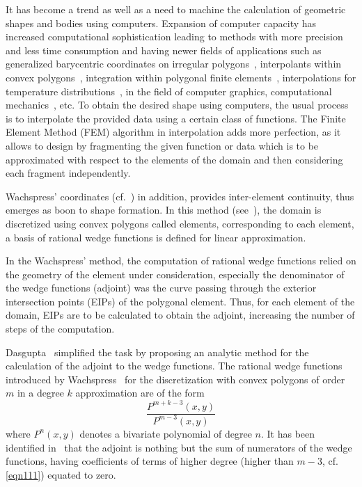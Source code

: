 \documentclass[automatic-bibliography]{univsciauth}
\begin{document}
It has become a trend as well as a need to machine the calculation of geometric
shapes and bodies using computers. Expansion of computer capacity has increased
computational sophistication leading to methods with more precision and less
time consumption and having newer fields of applications such as generalized
barycentric coordinates on irregular polygons~\cite{7}, interpolants within
convex polygons~\cite{das}, integration within polygonal finite
elements~\cite{9}, interpolations for temperature distributions~\cite{10}, in
the field of computer graphics, computational mechanics~\cite{11}, etc. To
obtain the desired shape using computers, the usual process is to interpolate
the provided data using a certain class of functions. The Finite Element Method
(FEM) algorithm in interpolation adds more perfection, as it allows to design by
fragmenting the given function or data which is to be approximated with respect
to the elements of the domain and then considering each fragment independently.

Wachspress' coordinates (cf.~\cite{wach}) in addition, provides inter-element
continuity, thus emerges as boon to shape formation. In this method
(see~\cite{wachs}), the domain is discretized using convex polygons called
elements, corresponding to each element, a basis of rational wedge functions is
defined for linear approximation.

In the Wachspress\rq{} method, the computation of rational wedge functions
relied on the geometry of the element under consideration, especially the
denominator of the wedge functions (adjoint) was the curve passing through the
exterior intersection points (EIPs) of the polygonal element. Thus, for each
element of the domain, EIPs are to be calculated to obtain the adjoint,
increasing the number of steps of the computation.

Dasgupta~\cite{das} simplified the task by proposing an analytic method for the
calculation of the adjoint to the wedge functions. The rational wedge functions
introduced by Wachspress~\cite{wachs} for the discretization with convex
polygons of order $m$ in a degree $k$ approximation are of the form
\begin{equation}
  \frac{P^{m+k-3}(x,y)}{P^{m-3}(x,y)} \label{eqn111}
\end{equation}
where $P^n(x,y)$ denotes a bivariate polynomial of degree $n$. It has been
identified in~\cite{das} that the adjoint is nothing but the sum of numerators
of the wedge functions, having coefficients of terms of higher degree (higher
than $m-3$, cf. \autoref{eqn111}) equated to zero.
\end{document}
